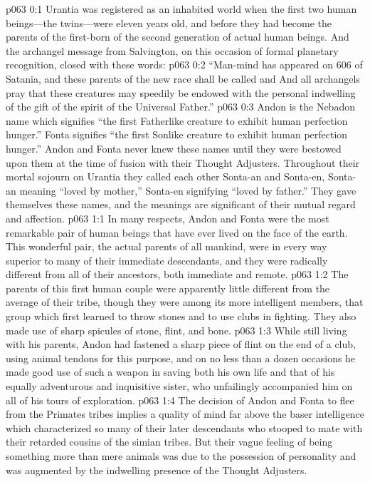 \author{Life Carrier}
\vs p063 0:1 Urantia was registered as an inhabited world when the first two human beings---the twins---were eleven years old, and before they had become the parents of the first\hyp{}born of the second generation of actual human beings. And the archangel message from Salvington, on this occasion of formal planetary recognition, closed with these words:
\vs p063 0:2 “Man\hyp{}mind has appeared on 606 of Satania, and these parents of the new race shall be called  and  And all archangels pray that these creatures may speedily be endowed with the personal indwelling of the gift of the spirit of the Universal Father.”
\pc \vs p063 0:3 Andon is the Nebadon name which signifies “the first Fatherlike creature to exhibit human perfection hunger.” Fonta signifies “the first Sonlike creature to exhibit human perfection hunger.” Andon and Fonta never knew these names until they were bestowed upon them at the time of fusion with their Thought Adjusters. Throughout their mortal sojourn on Urantia they called each other Sonta\hyp{}an and Sonta\hyp{}en, Sonta\hyp{}an meaning “loved by mother,” Sonta\hyp{}en signifying “loved by father.” They gave themselves these names, and the meanings are significant of their mutual regard and affection.\plusone
{}
\vs p063 1:1 In many respects, Andon and Fonta were the most remarkable pair of human beings that have ever lived on the face of the earth. This wonderful pair, the actual parents of all mankind, were in every way superior to many of their immediate descendants, and they were radically different from all of their ancestors, both immediate and remote.
\vs p063 1:2 The parents of this first human couple were apparently little different from the average of their tribe, though they were among its more intelligent members, that group which first learned to throw stones and to use clubs in fighting. They also made use of sharp spicules of stone, flint, and bone.
\vs p063 1:3 While still living with his parents, Andon had fastened a sharp piece of flint on the end of a club, using animal tendons for this purpose, and on no less than a dozen occasions he made good use of such a weapon in saving both his own life and that of his equally adventurous and inquisitive sister, who unfailingly accompanied him on all of his tours of exploration.
\vs p063 1:4 The decision of Andon and Fonta to flee from the Primates tribes implies a quality of mind far above the baser intelligence which characterized so many of their later descendants who stooped to mate with their retarded cousins of the simian tribes. But their vague feeling of being something more than mere animals was due to the possession of personality and was augmented by the indwelling presence of the Thought Adjusters.
